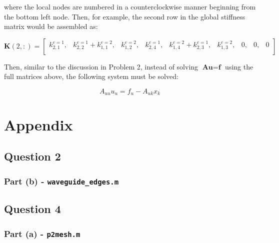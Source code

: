 \documentclass[10pt]{article}
\newcommand{\beq}{\begin{equation}}
\newcommand{\eeq}{\end{equation}}
\begin{document}
where the local nodes are numbered in a counterclockwise manner beginning from the bottom left node. Then, for example, the second row in the global stiffness matrix would be assembled as:

\begin{equation}
\textbf{K}(2,:)=\begin{bmatrix}
k_{2,1}^{e=1}, & k_{2,2}^{e=1}+k_{1,1}^{e=2}, & k_{1,2}^{e=2}, & k_{2,4}^{e=1}, & k_{1,4}^{e=2}+k_{2,3}^{e=1}, & k_{1,3}^{e=2}, & 0, & 0, & 0\\
\end{bmatrix}
\end{equation}

Then, similar to the discussion in Problem 2, instead of solving \(\textbf{A}\textbf{u}=\textbf{f}\) using the full matrices above, the following system must be solved:

\beq
A_{uu}u_u=f_u-A_{uk}x_k
\eeq


\section{Appendix}
\subsection{Question 2}
\subsubsection{Part (b) - {\tt waveguide\_edges.m}}

\subsection{Question 4}
\subsubsection{Part (a) - {\tt p2mesh.m}}

\end{document}

